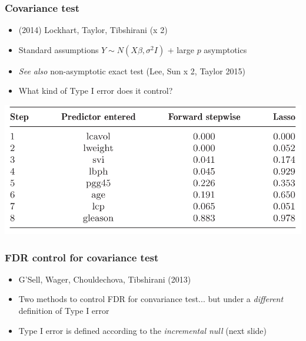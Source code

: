 \documentclass{beamer}
\begin{document}
\begin{frame}
\frametitle{Covariance test}
\begin{itemize}
\item (2014) Lockhart, Taylor, Tibshirani (x 2)
\item Standard assumptions $Y \sim N(X\beta, \sigma^2 I)$ + large $p$ asymptotics
\item \emph{See also} non-asymptotic exact test (Lee, Sun x 2, Taylor 2015)
\item What kind of Type I error does it control?
\end{itemize}
\begin{center}
\includegraphics[scale = 0.25]{covtest.png}
\end{center}
\end{frame}

\begin{frame}
\frametitle{FDR control for covariance test}
\begin{itemize}
\item G'Sell, Wager, Chouldechova, Tibshirani (2013)
\item Two methods to control FDR for convariance test... but under a \emph{different} definition of Type I error
\item Type I error is defined according to the \emph{incremental null} (next slide)
\end{itemize}
\end{frame}
\end{document}
